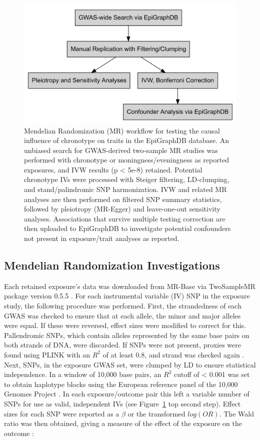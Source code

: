 \documentclass[journal,article,submit,moreauthors,pdftex]{Definitions/mdpi}
\begin{document}
\begin{figure}[htbp]
	\centering
	\includegraphics[width=0.9\linewidth]{Figs/Analysis1/outline.png}
	\caption{Mendelian Randomization (MR) workflow for testing the causal influence of chronotype on traits in the EpiGraphDB database. An unbiased search for GWAS-derived two-sample MR studies was performed with chronotype or moningness/eveningness as reported exposures, and IVW results (p < 5e-8) retained. Potential chronotype IVs were processed with Steiger filtering, LD-clumping, and stand/palindromic SNP harmonization. IVW and related MR analyses are then performed on filtered SNP summary statistics, followed by pleiotropy (MR-Egger) and leave-one-out sensitivity analyses. Associations that survive multiple testing correction are then uploaded to EpiGraphDB to investigate potential confounders not present in exposure/trait analyses as reported.}
	\label{fig:MR_Workflow}
\end{figure}

\subsection{Mendelian Randomization Investigations}

Each retained exposure's data was downloaded from MR-Base via TwoSampleMR package version 0.5.5 \cite{hemani_mr-base_2018}. For each instrumental variable (IV) SNP in the exposure study, the following procedure was performed. First, the strandedness of each GWAS was checked to ensure that at each allele, the minor and major alleles were equal. If these were reversed, effect sizes were modified to correct for this. Pallendromic SNPs, which contain alleles represented by the same base pairs on both strands of DNA, were discarded. If SNPs were not present, proxies were found using PLINK with an $R^2$ of at least 0.8, and strand was checked again \cite{plink}. Next, SNPs, in the exposure GWAS set, were clumped by LD to ensure statistical independence. In a window of 10,000 base pairs, an $R^2$ cutoff of < 0.001 was set to obtain haplotype blocks using the European reference panel of the 10,000 Genomes Project \cite{10kgenomes}. In each exposure/outcome pair this left a variable number of SNPs for use as valid, independent IVs (see Figure~\ref{fig:MR_Workflow} top second step). Effect sizes for each SNP were reported as a $\beta$ or the transformed $log(OR)$. The Wald ratio was then obtained, giving a measure of the effect of the exposure on the outcome \cite{rasooly_conducting_2019}: 
\end{document}
